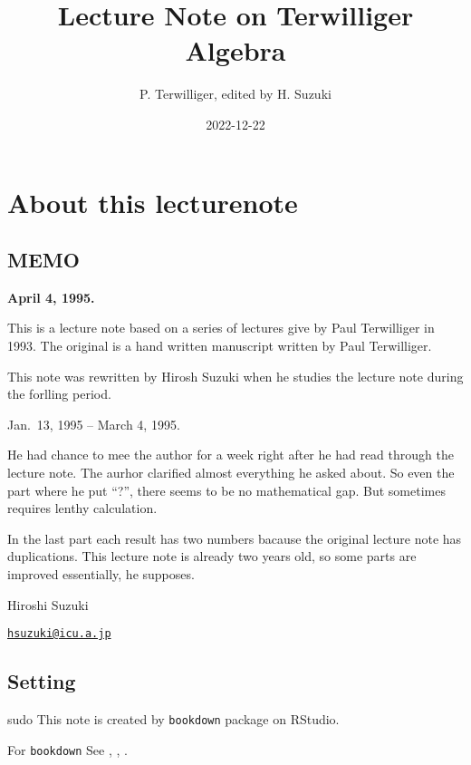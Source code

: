 \documentclass[
]{book}
\title{Lecture Note on Terwilliger Algebra}
\author{P. Terwilliger, edited by H. Suzuki}
\date{2022-12-22}
\theoremstyle{definition}
\theoremstyle{definition}
\theoremstyle{definition}
\theoremstyle{definition}
\theoremstyle{remark}
\begin{document}
\maketitle

{
\setcounter{tocdepth}{1}
\tableofcontents
}
\hypertarget{about-this-lecturenote}{%
\chapter*{About this lecturenote}\label{about-this-lecturenote}}

\hypertarget{memo}{%
\section*{MEMO}\label{memo}}

\textbf{April 4, 1995.}

This is a lecture note based on a series of lectures give by Paul Terwilliger in 1993. The original is a hand written manuscript written by Paul Terwilliger.

This note was rewritten by Hirosh Suzuki when he studies the lecture note during the forlling period.

Jan.~13, 1995 -- March 4, 1995.

He had chance to mee the author for a week right after he had read through the lecture note. The aurhor clarified almost everything he asked about. So even the part where he put ``?'', there seems to be no mathematical gap. But sometimes requires lenthy calculation.

In the last part each result has two numbers bacause the original lecture note has duplications. This lecture note is already two years old, so some parts are improved essentially, he supposes.

Hiroshi Suzuki

\href{mailto:hsuzuki@icu.a.jp}{\nolinkurl{hsuzuki@icu.a.jp}}

\hypertarget{setting}{%
\section*{Setting}\label{setting}}

sudo
This note is created by \texttt{bookdown} package on RStudio.

For \texttt{bookdown} See \citep{xie2015}, \citep{xie2017}, \citep{xie2018}.
\end{document}
